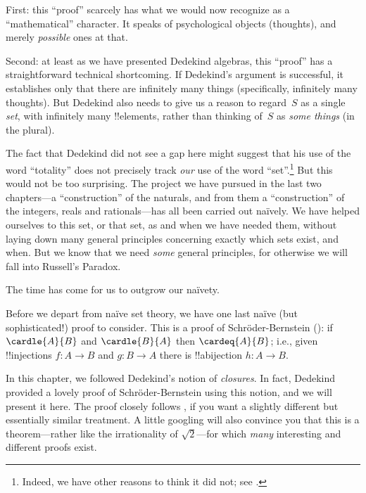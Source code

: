 First: this ``proof'' scarcely has what we would now recognize as a
``mathematical'' character. It speaks of psychological objects
(thoughts), and merely \emph{possible} ones at that.

Second: at least as we have presented Dedekind algebras, this
``proof'' has a straightforward technical shortcoming. If Dedekind's
argument is successful, it establishes only that there are infinitely
many things (specifically, infinitely many thoughts). But Dedekind
also needs to give us a reason to regard~$S$ as a single \emph{set},
with infinitely many !!{element}s, rather than thinking of~$S$ as
\emph{some things} (in the plural). 

The fact that Dedekind did not see a gap here might suggest that his
use of the word ``totality'' does not precisely track \emph{our} use
of the word ``set''.\footnote{Indeed, we have other reasons to think
it did not; see \citet[p.~23]{Potter2004}.} But this would not be
too surprising. The project we have pursued in the last two
chapters---a ``construction'' of the naturals, and from them a
``construction'' of the integers, reals and rationals---has all been
carried out na\"ively. We have helped ourselves to this set, or that
set, as and when we have needed them, without laying down many general
principles concerning exactly which sets exist, and when. But we know
that we need \emph{some} general principles, for otherwise we will
fall into Russell's Paradox.

 The time has come for us to outgrow our na\"ivety. 






Before we depart from na\"ive set theory, we have one last na\"ive
(but sophisticated!) proof to consider. This is a proof of
Schr\"oder-Bernstein (): if
$\cardle{A}{B}$ and $\cardle{B}{A}$ then $\cardeq{A}{B}$; i.e., given
!!{injection}s $f \colon A \to B$ and $g \colon B \to A$ there is
!!a{bijection} $h \colon A \to B$. 

In this chapter, we followed Dedekind's notion of \emph{closures}. In
fact, Dedekind provided a lovely proof of Schr\"oder-Bernstein using this notion, and we
will present it here. The proof closely follows
\citet[pp.~157--8]{Potter2004}, if you want a slightly different but
essentially similar treatment. A little googling will also convince
you that this is a theorem---rather like the irrationality of
$\sqrt{2}$---for which \emph{many} interesting and different proofs
exist.

